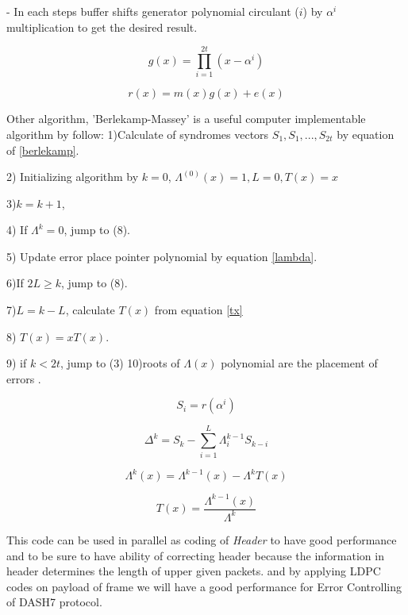 - In each steps buffer shifts generator polynomial circulant ($i$) by $\alpha^{i}$ multiplication to get the desired result. 

\begin{equation}\label{rspoly}
g(x) = \prod_{i=1}^{2t} (x-\alpha^{i})
\end{equation}

\begin{equation}\label{awgnrs}
 r(x) = m(x) g(x) + e(x) 
\end{equation}      

Other algorithm, 'Berlekamp-Massey' is a useful computer implementable algorithm by follow:
%
1)Calculate of syndromes vectors $S_{1},S_{1}, ...,S_{2t}$ by equation of \ref{berlekamp}.

2) Initializing algorithm by $k = 0$, $\Lambda^{(0)}(x) = 1, L = 0, T(x) = x$

3)$k = k +1$, %

4) If $\Lambda^{k} = 0$, jump to (8).

5) Update error place pointer polynomial by equation \ref{lambda}.

6)If $2L\geqslant k$, jump to (8).

7)$L = k - L$, calculate $T(x)$ from equation \ref{tx}

8) $T(x) = xT(x)$.

9) if $k<2t$, jump to (3) 10)roots of $\Lambda(x)$ polynomial are the placement of errors \cite{rs}. 


\begin{equation}\label{berlekamp}
S_{i} = r(\alpha^{i})
\end{equation}

\begin{equation} \label{chien}
\Delta^{k} = S_{k} - \sum_{i = 1}^{L} \Lambda_{i}^{k-1}S_{k-i}
\end{equation} 

\begin{equation} \label{lambda}
\Lambda^{k} (x) = \Lambda^{k-1}(x) - \Lambda^{k} T(x)
\end{equation}

\begin{equation} \label{tx}
T(x) = \frac{\Lambda^{k-1}(x)}{\Lambda^{k}}
\end{equation}


This code can be used in parallel as coding of \textit{Header} to have good performance and to be sure to have ability of correcting header because the information in header determines the length of upper given packets. and by applying LDPC codes on payload of frame we will have a good performance for Error Controlling of DASH7 protocol. 
